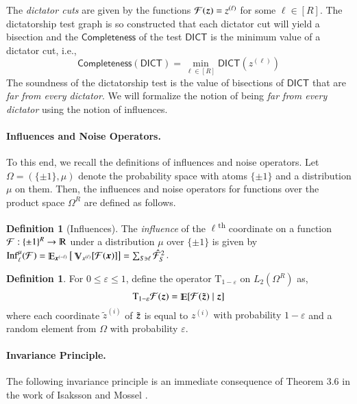\documentclass[11pt]{article}
\theoremstyle{definition}
\newtheorem{definition}[theorem]{Definition}
\newcommand{\Esymb}{\mathbb{E}}
\newcommand{\Vsymb}{\mathbb{V}}
\DeclareMathOperator*{\E}{\Esymb}
\DeclareMathOperator*{\Var}{\Vsymb}
\newcommand{\sbits}{\{\pm1\}}
\renewcommand{\th}{\textsuperscript{th}\xspace}
\DeclareMathOperator{\Inf}{Inf}
\newcommand{\R}{\mathbb R}
\newcommand{\cF}{\mathcal F}
\renewcommand{\leq}{\leqslant}
\let\epsilon=\varepsilon
\numberwithin{equation}{section}
\newcommand{\eps}{\epsilon}
\let\origparagraph\paragraph
\renewcommand{\paragraph}[1]{\origparagraph{#1.}}
\newcommand{\dict} {\textsf{DICT}}
\newcommand{\mrv}[1]{\bm{\lowercase{#1}}}
\newcommand{\orf}[1]{\mathcal{\uppercase{#1}}}
\newcommand{\T}{\mathrm{T}}
\begin{document}
	The {\it dictator cuts} are given by the functions
	$\cF(\mrv{z}) = z^{(\ell)}$ for some $\ell \in [R]$.
	The dictatorship test graph is so constructed that each
	dictator cut will yield a bisection and the $\mathsf{Completeness}$ of the test $\dict$ is the minimum value of a dictator cut, i.e.,
	$$ \mathsf{Completeness}(\dict) = \min_{\ell \in [R]}
	\dict(z^{(\ell)}) $$
	The soundness of the dictatorship test is the value of
	bisections of $\dict$ that are {\it far from every dictator}.  We will formalize the notion of being
	{\it far from every dictator} using the notion of influences.

\paragraph{Influences and Noise Operators}

	To this end, we recall the definitions of influences and noise
	operators.  Let $\Omega = (\sbits,\mu)$ denote the probability space with atoms
$\sbits$ and a distribution $\mu$ on them.  Then, the influences and
noise operators for functions over the product space $\Omega^R$ are
defined as follows.
	\begin{definition}[Influences]
	The {\it influence} of the $\ell$\th coordinate on a function
	$\orf{F}: \sbits^R \to \R$ under a distribution $\mu$
	over $\sbits$ is given by
	$\Inf^{\mu}_\ell(\orf{F})
	=\E_{\mrv{x}^{(-\ell)}}\big[\Var_{x^{(\ell)}}[\orf{F}(\mrv{x})]\big]
	= \sum_{S \ni \ell} \hat{\orf{F}}_S^2$.
	\end{definition}
	
\begin{definition}
  For $0\leq \eps \leq 1$, define the operator $\T_{1-\eps}$ on
$L_{2}(\Omega^{R})$ as,
$$ \T_{1-\eps} \orf{F} (\mrv{z})  = \E[\orf{F}(\tilde{\mrv{z}})\mid
\mrv{z}] $$
where each coordinate $\tilde{z}^{(i)}$ of $\tilde{\mrv{z}}$ is  equal
to $z^{(i)}$
\textrm{ with probability $1-\eps$} and a random element from
$\Omega$ with probability $\eps$.
\end{definition}

\paragraph{Invariance Principle}

The following invariance principle is an immediate consequence of
Theorem $3.6$ in the work of Isaksson and Mossel \cite{IsakssonM09}.
\end{document}
